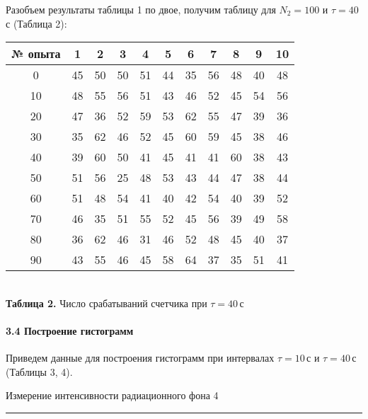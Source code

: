 \documentclass[12pt,a4paper]{scrartcl}
\begin{document}
	\par Разобъем результаты таблицы 1 по двое, получим таблицу для $N_2 = 100$ и $\tau = 40\,$с (Таблица 2):
	\begin{center}
		\begin{tabular}{|c|c|c|c|c|c|c|c|c|c|c|}
			\hline № опыта & 1 & 2 & 3 & 4 & 5 & 6 & 7 & 8 & 9 & 10
			\\\hline 0 & 45 & 50 & 50 & 51 & 44 & 35 & 56 & 48 & 40 & 48
			\\\hline 10 & 48 & 55 & 56 & 51 & 43 & 46 & 52 & 45 & 54 & 56
			\\\hline 20 & 47 & 36 & 52 & 59 & 53 & 62 & 55 & 47 & 39 & 36
			\\\hline 30 & 35 & 62 & 46 & 52 & 45 & 60 & 59 & 45 & 38 & 46
			\\\hline 40 & 39 & 60 & 50 & 41 & 45 & 41 & 41 & 60 & 38 & 43
			\\\hline 50 & 51 & 56 & 25 & 48 & 53 & 43 & 44 & 47 & 38 & 44
			\\\hline 60 & 51 & 48 & 54 & 41 & 40 & 42 & 54 & 40 & 39 & 52
			\\\hline 70 & 46 & 35 & 51 & 55 & 52 & 45 & 56 & 39 & 49 & 58
			\\\hline 80 & 36 & 62 & 46 & 31 & 46 & 52 & 48 & 45 & 40 & 37
			\\\hline 90 & 43 & 55 & 46 & 45 & 58 & 64 & 37 & 35 & 51 & 41
			\\\hline
		\end{tabular}
		\\\textbf{Таблица 2.} Число срабатываний счетчика при $\tau = 40\,$с
	\end{center}
	
	\paragraph{3.4 Построение гистограмм} \hfill
	
	\par Приведем данные для построения гистограмм при интервалах $\tau = 10\,$с и $\tau = 40\,$с (Таблицы 3, 4).
	
	\newpage
	\begin{flushleft}
		\footnotesize{Измерение интенсивности радиационного фона} \hspace{\fill} \footnotesize{4}
		\\[-0.3cm]\noindent\rule{\textwidth}{0.3pt}
	\end{flushleft}
	
\end{document}
